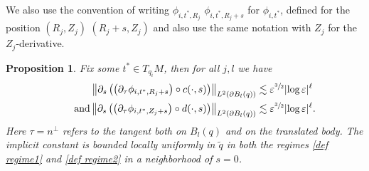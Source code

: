 \documentclass[JEP,XML,SOM,Unicode,published]{cedram}
\let\epsilon\varepsilon
\newtheorem{proposition}[theorem]{Proposition}
\theoremstyle{definition}
\newcommand\norm[1]{\left\lVert #1\right\rVert}
\let\de\partial
\let\eps\epsilon
\begin{document}
We also use the convention of writing $\phi_{i,t^*,R_j}$ \resp $\phi_{i,t^*,R_j+s}$ for $\phi_{i,t^*}$, defined for the position $(R_j,Z_j)$ \resp $(R_j+s,Z_j)$ and also use the same notation with $Z_j$ for the $Z_j$-derivative.

\begin{proposition}\label{prop deri}
Fix some $t^*\in T_{q_i}M$, then for all $j,l$ we have
\begin{align*}
\norm{\de_s \left(\left(\de_{\tau}\phi_{i,t^*,R_j+s}\right)\circ c(\cdot,s)\right)}_{L^2(\de B_l(q))}&\lesssim \eps^{\sfrac{3}{2}}|{\log\eps}|^\ell\\
\tag*{and}
\norm{\de_s \left(\left(\de_{\tau}\phi_{i,t^*,Z_j+s}\right)\circ d(\cdot,s)\right)}_{L^2(\de B_l(q))}&\lesssim \eps^{\sfrac{3}{2}}|{\log\eps}|^\ell.
\end{align*}
Here $\tau=n^\perp$ refers to the tangent both on $B_l(q)$ and on the translated body. The implicit constant is bounded locally uniformly in $\tilde{q}$ in both the regimes \eqref{def regime1} and \eqref{def regime2} in a neighborhood of $s=0$.
\end{proposition}
\end{document}

